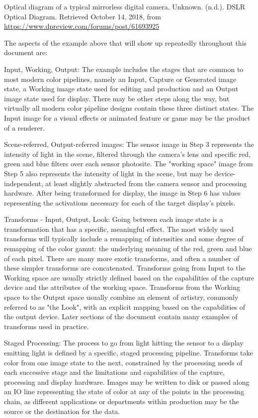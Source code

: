 Optical diagram of a typical mirrorless digital camera.
Unknown. (n.d.). DSLR Optical Diagram. Retrieved October 14, 2018, from \url{https://www.dpreview.com/forums/post/61693925}

The aspects of the example above that will show up repeatedly throughout this document are:

Input, Working, Output: The example includes the stages that are common to most modern color pipelines, namely an Input, Capture or Generated image state, a Working image state used for editing and production and an Output image state used for display. There may be other steps along the way, but virtually all modern color pipeline designs contain these three distinct states. The Input image for a visual effects or animated feature or game may be the product of a renderer.

Scene-referred, Output-referred images: The sensor image in Step 3 represents the intensity of light in the scene, filtered through the camera's lens and specific red, green and blue filters over each sensor photosite. The "working space" image from Step 5 also represents the intensity of light in the scene, but may be device-independent, at least slightly abstracted from the camera sensor and processing hardware. After being transformed for display, the image in Step 6 has values representing the activations necessary for each of the target display's pixels.

Transforms - Input, Output, Look: Going between each image state is a transformation that has a specific, meaningful effect. The most widely used transforms will typically include a remapping of intensities and some degree of remapping of the color gamut: the underlying meaning of the red, green and blue of each pixel. There are many more exotic transforms, and often a number of these simpler transforms are concatenated. Transforms going from Input to the Working space are usually strictly defined based on the capabilities of the capture device and the attributes of the working space. Transforms from the Working space to the Output space usually combine an element of artistry, commonly referred to as "the Look", with an explicit mapping based on the capabilities of the output device. Later sections of the document contain many examples of transforms used in practice.

Staged Processing: The process to go from light hitting the sensor to a display emitting light is defined by a specific, staged processing pipeline. Transforms take color from one image state to the next, constrained by the processing needs of each successive stage and the limitations and capabilities of the capture, processing and display hardware. Images may be written to disk or passed along an IO line representing the state of color at any of the points in the processing chain, as different applications or departments within production may be the source or the destination for the data.

